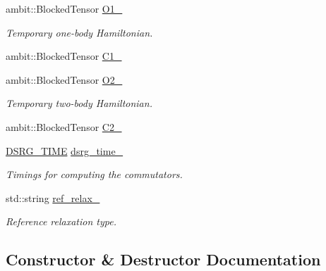 \begin{DoxyCompactItemize}
ambit\+::\+Blocked\+Tensor \mbox{\hyperlink{classforte_1_1_d_s_r_g___m_r_p_t_ad28fba643f97278be8adb3233628c9e9}{O1\+\_\+}}
\begin{DoxyCompactList}\small\item\em Temporary one-\/body Hamiltonian. \end{DoxyCompactList}\item 
ambit\+::\+Blocked\+Tensor \mbox{\hyperlink{classforte_1_1_d_s_r_g___m_r_p_t_a4822fbb6db6a9310145efb9c139c9959}{C1\+\_\+}}
\item 
ambit\+::\+Blocked\+Tensor \mbox{\hyperlink{classforte_1_1_d_s_r_g___m_r_p_t_a7542603415ce77c3af6f8f6bc3e69f2d}{O2\+\_\+}}
\begin{DoxyCompactList}\small\item\em Temporary two-\/body Hamiltonian. \end{DoxyCompactList}\item 
ambit\+::\+Blocked\+Tensor \mbox{\hyperlink{classforte_1_1_d_s_r_g___m_r_p_t_a14ca0f3e6d6b6d9393081a5a7858d0df}{C2\+\_\+}}
\item 
\mbox{\hyperlink{classforte_1_1_d_s_r_g___t_i_m_e}{D\+S\+R\+G\+\_\+\+T\+I\+ME}} \mbox{\hyperlink{classforte_1_1_d_s_r_g___m_r_p_t_ae8909ebe3e5832331ac675efd506a235}{dsrg\+\_\+time\+\_\+}}
\begin{DoxyCompactList}\small\item\em Timings for computing the commutators. \end{DoxyCompactList}\item 
std\+::string \mbox{\hyperlink{classforte_1_1_d_s_r_g___m_r_p_t_ae1c05dc85b9ac7fb3ab233fd36d8c5f4}{ref\+\_\+relax\+\_\+}}
\begin{DoxyCompactList}\small\item\em Reference relaxation type. \end{DoxyCompactList}\end{DoxyCompactItemize}


\subsection{Constructor \& Destructor Documentation}
\mbox{\label{classforte_1_1_d_s_r_g___m_r_p_t_a675c39945f959015eb41954094f4bdd4}} 
